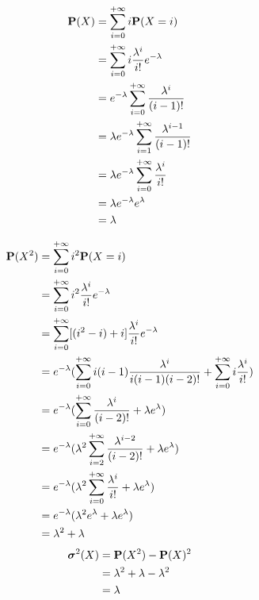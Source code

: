 \begin{proposition}
  \label{pro:previsione_distribuzione_di_poisson}
  \begin{align*}
    \mathbf{P}(X) &= \sum_{i=0}^{+ \infty} i \mathbf{P}(X = i) \\
    &= \sum_{i=0}^{+ \infty} i \frac{\lambda^i}{i!} e^{- \lambda} \\
    &= e^{- \lambda} \sum_{i=0}^{+ \infty} \frac{\lambda^i}{(i-1)!} \\
    &= \lambda e^{- \lambda} \sum_{i=1}^{+ \infty} \frac{\lambda^{i-1}}{(i-1)!} \\
    &= \lambda e^{- \lambda} \sum_{i=0}^{+ \infty} \frac{\lambda^{i}}{i!} \\
    &= \lambda e^{- \lambda} e^\lambda \\
    &= \lambda
  \end{align*}
\end{proposition}
\begin{proposition}
  \label{pro:varianza_distribuzione_di_poisson}
  \begin{align*}
    \mathbf{P}(X^2) &= \sum_{i=0}^{+ \infty} i^2 \mathbf{P}(X = i) \\
    &= \sum_{i=0}^{+ \infty} i^2 \frac{\lambda^i}{i!} e^{- \lambda} \\
    &= \sum_{i=0}^{+ \infty} [(i^2 - i) + i] \frac{\lambda^i}{i!} e^{- \lambda} \\
    &= e^{- \lambda} (\sum_{i=0}^{+ \infty} i(i - 1) \frac{\lambda^i}{i(i-1)(i-2)!} + \sum_{i=0}^{+ \infty} i \frac{\lambda^i}{i!}) \\
    &= e^{- \lambda} (\sum_{i=0}^{+ \infty} \frac{\lambda^i}{(i-2)!} + \lambda e^\lambda) \\
    &= e^{- \lambda} (\lambda^2 \sum_{i=2}^{+ \infty} \frac{\lambda^{i-2}}{(i-2)!} + \lambda e^\lambda) \\
    &= e^{- \lambda} (\lambda^2 \sum_{i=0}^{+ \infty} \frac{\lambda^i}{i!} + \lambda e^\lambda) \\
    &= e^{- \lambda} (\lambda^2 e^\lambda + \lambda e^\lambda) \\
    &= \lambda^2 + \lambda
  \end{align*}
  \begin{align*}
    \boldsymbol\sigma^2(X) &= \mathbf{P}(X^2) - \mathbf{P}(X)^2 \\
    &= \lambda^2 + \lambda - \lambda^2 \\
    &= \lambda
  \end{align*}
\end{proposition}

